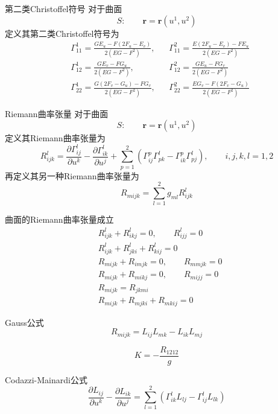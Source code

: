 \documentclass[lang = cn, scheme = chinese, thmcnt = section]{elegantbook}
\newcommand{\bs}{\boldsymbol}          %
\begin{document}
\begin{definition}{第二类Christoffel符号}
	对于曲面%
	$$
	S:\qquad \bs{r}=\bs{r}(u^1,u^2)
	$$
	定义其第二类Christoffel符号为
	\begin{align*}
		& \Gamma_{11}^{1}=\frac{GE_u-F(2F_u-E_v)}{2(EG-F^2)},
		&& \Gamma_{11}^{2}=\frac{E(2F_u-E_v)-FE_u}{2(EG-F^2)}\\
		& \Gamma_{12}^{1}=\frac{GE_v-FG_u}{2(EG-F^2)},
		&&\Gamma_{12}^{2}=\frac{GE_u-FG_v}{2(EG-F^2)}\\
		& \Gamma_{22}^{1}=\frac{G(2F_v-G_u)-FG_v}{2(EG-F^2)},
		&& \Gamma_{22}^{2}=\frac{EG_v-F(2F_v-G_u)}{2(EG-F^2)}
	\end{align*}
\end{definition}

\begin{definition}{Riemann曲率张量}
	对于曲面%
	$$
	S:\qquad \bs{r}=\bs{r}(u^1,u^2)
	$$
	定义其Riemann曲率张量为%
	$$
	R_{ijk}^{l}=\frac{\partial\Gamma_{ij}^{l}}{\partial u^k}-\frac{\partial\Gamma_{ik}^{l}}{\partial u^j}
	+\sum_{p=1}^{2}\left(\Gamma_{ij}^p\Gamma_{pk}^{l}-\Gamma_{ik}^{p}\Gamma_{pj}^{l}\right),\qquad 
	i,j,k,l=1,2
	$$
	再定义其另一种Riemann曲率张量为%
	$$
	R_{mijk}=\sum_{l=1}^{2}g_{ml}R_{ijk}^l
	$$
\end{definition}

\begin{proposition}
	曲面的Riemann曲率张量成立
	\begin{align*}
		& R_{ijk}^l+R_{ikj}^l=0,\qquad R_{ijj}^l=0\\
		& R_{ijk}^l+R_{jki}^l+R_{kij}^l=0\\
		& R_{mijk}+R_{imjk}=0,\qquad R_{mmjk}=0\\
		& R_{mijk}+R_{mikj}=0,\qquad R_{mijj}=0\\
		& R_{mijk}=R_{jkmi}\\
		& R_{mijk}+R_{mjki}+R_{mkij}=0
	\end{align*}
\end{proposition}

\begin{theorem}{Gauss公式}
	$$
	R_{mijk}=L_{ij}L_{mk}-L_{ik}L_{mj}
	$$
\end{theorem}

\begin{corollary}
	$$
	K=-\frac{R_{1212}}{g}
	$$
\end{corollary}

\begin{theorem}{Codazzi-Mainardi公式}
	$$
	\frac{\partial L_{ij}}{\partial u^k}
	-\frac{\partial L_{ik}}{\partial u^j}
	=\sum_{l=1}^{2}\left(\Gamma_{ik}^{l}L_{lj}-\Gamma_{ij}^lL_{lk}\right)
	$$
\end{theorem}
\end{document}
